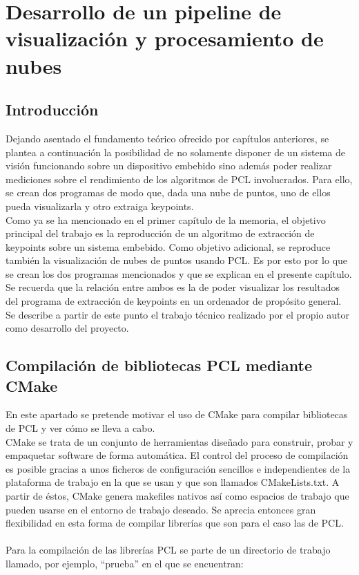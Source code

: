 \chapter{Desarrollo de un pipeline de visualización y procesamiento de nubes}

\section{Introducción}
Dejando asentado el fundamento teórico ofrecido por capítulos anteriores, se plantea a continuación la posibilidad de no solamente disponer de un sistema de visión funcionando sobre un dispositivo embebido sino además poder realizar mediciones sobre el rendimiento de los algoritmos de PCL involucrados. Para ello, se crean dos programas de modo que, dada una nube de puntos, uno de ellos pueda visualizarla y otro extraiga keypoints.
\\
Como ya se ha mencionado en el primer capítulo de la memoria, el objetivo principal del trabajo es la reproducción de un algoritmo de extracción de keypoints sobre un sistema embebido. Como objetivo adicional, se reproduce también la visualización de nubes de puntos usando PCL. Es por esto por lo que se crean los dos programas mencionados y que se explican en el presente capítulo. Se recuerda que la relación entre ambos es la de poder visualizar los resultados del programa de extracción de keypoints en un ordenador de propósito general.
\\
Se describe a partir de este punto el trabajo técnico realizado por el propio autor como desarrollo del proyecto.

\section{Compilación de bibliotecas PCL mediante CMake}
En este apartado se pretende motivar el uso de CMake para compilar bibliotecas de PCL y ver cómo se lleva a cabo. 
\\
CMake se trata de un conjunto de herramientas diseñado para construir, probar y empaquetar software de forma automática. El control del proceso de compilación es posible gracias a unos ficheros de configuración sencillos e independientes de la plataforma de trabajo en la que se usan y que son llamados CMakeLists.txt. A partir de éstos, CMake genera makefiles nativos así como espacios de trabajo que pueden usarse en el entorno de trabajo deseado. Se aprecia entonces gran flexibilidad en esta forma de compilar librerías que son para el caso las de PCL.
\\
\\
Para la compilación de las librerías PCL se parte de un directorio de trabajo llamado, por ejemplo, ``prueba'' en el que se encuentran:

